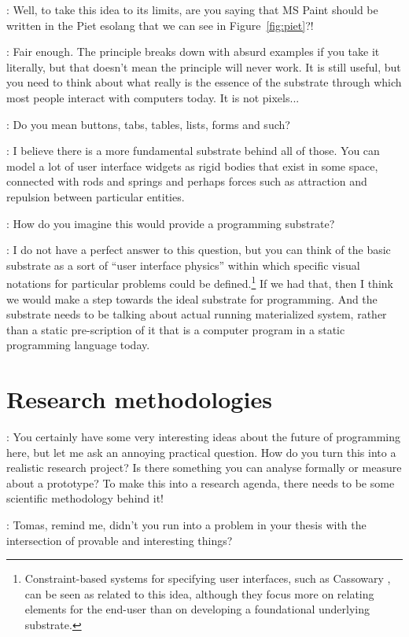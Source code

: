 \documentclass[runningheads]{llncs}
\newcommand{\T}{Tomas}
\newcommand{\J}{Joel}
\newcommand{\says}[2][gg]{\vspace{0.5em}\noindent\hangindent=0.5cm{\textsc{#1}}: #2}
\begin{document}
\says[\T]{Well, to take this idea to its limits, are you saying that MS Paint should be written in the Piet esolang that we can see in Figure~\ref{fig:piet}?!}

\says[\J]{Fair enough. The principle breaks down with absurd examples if you take it literally, but that doesn't mean the principle will never work. It is still useful, but you need to think about what really is the essence of the substrate through which most people interact with computers today. It is not pixels...}

\says[\T]{Do you mean buttons, tabs, tables, lists, forms and such?}

\says[\J]{I believe there is a more fundamental substrate behind all of those. You can model a lot of user interface widgets as rigid bodies that exist in some space, connected with rods and springs and perhaps forces such as attraction and repulsion between particular entities.}

\says[\T]{How do you imagine this would provide a programming substrate?}

\says[\J]{I do not have a perfect answer to this question, but you can think of the basic substrate as a sort of ``user interface physics'' within which specific visual notations for particular problems could be defined.\footnote{Constraint-based systems for specifying user interfaces, such as Cassowary \cite{borning-1997-constraints}, can be seen as related to this idea, although they focus more on relating elements for the end-user than on developing a foundational underlying substrate.} If we had that, then I think we would make a step towards the ideal substrate for programming. And the substrate needs to be talking about actual running materialized system, rather than a static pre-scription of it that is a computer program in a static programming language today.}

\section{Research methodologies}

\says[\T]{You certainly have some very interesting ideas about the future of programming here, but let me ask an annoying practical question. How do you turn this into a realistic research project? Is there something you can analyse formally or measure about a prototype? To make this into a research agenda, there needs to be some scientific methodology behind it!}

\says[\J]{Tomas, remind me, didn't you run into a problem in your thesis with the intersection of provable and interesting things?}
\end{document}
